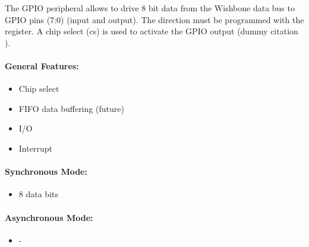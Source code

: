 The GPIO peripheral allows to drive 8 bit data from the Wishbone data bus to GPIO pins \asgpioPinExt(7:0) (input and output).  The direction must be programmed with the \asgpioDirRegExt  register. A chip select (cs) is used to activate the GPIO output (dummy citation \cite{lehm}).

\paragraph{General Features: }
\begin{itemize}
  \item Chip select
  \item FIFO data buffering (future)
  \item I/O 
  \item Interrupt 
\end{itemize}

\paragraph{Synchronous Mode: }
\begin{itemize}
  \item 8 data bits
\end{itemize}

\paragraph{Asynchronous Mode: }
\begin{itemize}
  \item -
\end{itemize}
